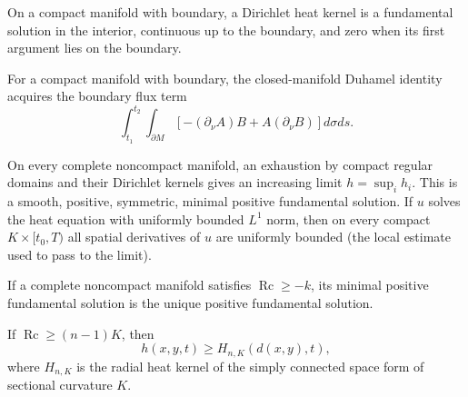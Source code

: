 \begin{definition}
\label{def:chow-ii-dirichlet-heat-kernel}
On a compact manifold with boundary, a Dirichlet heat kernel is a fundamental
solution in the interior, continuous up to the boundary, and zero when its
first argument lies on the boundary.
\end{definition}

\begin{lemma}
\label{lem:chow-ii-duhamel-boundary}
For a compact manifold with boundary, the closed-manifold Duhamel identity
acquires the boundary flux term
\[
\int_{t_1}^{t_2}\!\int_{\partial M}\left[-(\partial_\nu A)B+A(\partial_\nu B)\right]d\sigma ds.
\]
\end{lemma}

\begin{theorem}
\label{thm:chow-ii-minimal-positive-heat-kernel}
On every complete noncompact manifold, an exhaustion by compact regular
domains and their Dirichlet kernels gives an increasing limit $h=\sup_i h_i$.
This is a smooth, positive, symmetric, minimal positive fundamental solution.
If $u$ solves the heat equation with uniformly bounded $L^1$ norm, then on
every compact $K\times[t_0,T)$ all spatial derivatives of $u$ are uniformly
bounded (the local estimate used to pass to the limit).
\end{theorem}

\begin{theorem}
\label{thm:chow-ii-heat-kernel-uniqueness-lower-ricci}
If a complete noncompact manifold satisfies $\operatorname{Rc}\ge-k$, its
minimal positive fundamental solution is the unique positive fundamental
solution.
\end{theorem}

\begin{theorem}
\label{thm:chow-ii-cheeger-yau-heat-comparison}
If $\operatorname{Rc}\ge(n-1)K$, then
\[
h(x,y,t)\ge H_{n,K}(d(x,y),t),
\]
where $H_{n,K}$ is the radial heat kernel of the simply connected space form
of sectional curvature $K$.
\end{theorem}

